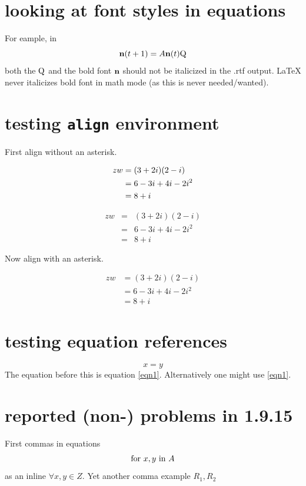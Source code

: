 ﻿\documentclass{article}
\begin{document}
\section{looking at font styles in equations}

For eample, in
\[ 
{\bf n}(t+1) = A {\bf n}(t) {\rm Q} 
\] 
both the $\rm Q$ and the bold font $\bf n$ should not be
italicized in the  .rtf output. LaTeX never italicizes bold font in math 
mode (as this is never needed/wanted). 

\section{testing \texttt{align} environment}

First align without an asterisk.

\begin{align} 
zw &=  (3+2i)(2-i) \notag \\ 
&=  6-3i+4i-2i^2   \notag \\ 
&=  8+i  \notag 
\end{align} 


\begin{eqnarray} 
zw &=&  (3+2i)(2-i) \nonumber \\ 
&=&  6-3i+4i-2i^2   \nonumber \\ 
&=&  8+i  \nonumber 
\end{eqnarray} 


Now align with an asterisk.


\begin{align*} 
zw &=  (3+2i)(2-i)  \\ 
&=  6-3i+4i-2i^2    \\ 
&=  8+i   
\end{align*} 


\section{testing equation references}
\begin{equation}
x=y
\label{eqn1}
\end{equation}
The equation before this is equation \ref{eqn1}.  Alternatively
one might use \eqref{eqn1}.

\section{reported (non-) problems in 1.9.15}
First commas in equations
$$
\hbox{for } x,y \hbox{ in } A
$$
as an inline $\forall x, y \in Z$.  Yet another comma example
$R_1, R_2$ 
\end{document}
